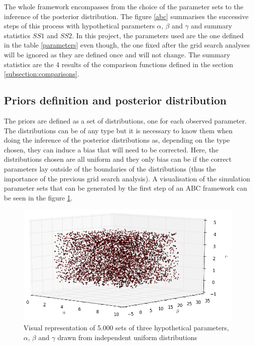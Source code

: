 \documentclass[a4paper,12pt]{report}
\begin{document}
The whole framework encompasses from the choice of the parameter sets to the inference of the posterior distribution. The figure \ref{abc} summarises the successive steps of this process with hypothetical parameters $\alpha$, $\beta$ and $\gamma$ and summary statistics $SS1$ and $SS2$. In this project, the parameters used are the one defined in the table \ref{parameters} even though, the one fixed after the grid search analyses will be ignored as they are defined once and will not change. The summary statistics are the 4 results of the comparison functions defined in the section \ref{subsection:comparisons}.

\subsection{Priors definition and posterior distribution}

The priors are defined as a set of distributions, one for each observed parameter. The distributions can be of any type but it is necessary to know them when doing the inference of the posterior distributions as, depending on the type chosen, they can induce a bias that will need to be corrected. Here, the distributions chosen are all uniform and they only bias can be if the correct parameters lay outside of the boundaries of the distributions (thus the importance of the previous grid search analysis). A visualisation of the simulation parameter sets that can be generated by the first step of an ABC framework can be seen in the figure \ref{abc-space}.

\begin{figure}
	\centering
	\includegraphics[scale=0.7]{../data/abc-space.png}
	\caption{Visual representation of 5.000 sets of three hypothetical parameters, $\alpha$, $\beta$ and $\gamma$ drawn from independent uniform distributions}
	\label{abc-space}
\end{figure}
\end{document}
